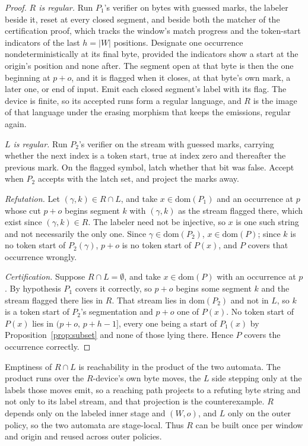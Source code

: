 \documentclass[11pt,a4paper]{article}
\theoremstyle{definition}
\theoremstyle{plain}
\begin{document}
\begin{proof} \emph{$R$ is regular.} Run $P_1$'s verifier on bytes with guessed marks, the labeler beside it, reset at
every closed segment, and beside both the matcher of the certification proof, which tracks the window's match progress
and the token-start indicators of the last $h = |W|$ positions. Designate one occurrence nondeterministically at its
final byte, provided the indicators show a start at the origin's position and none after. The segment open at that byte
is then the one beginning at $p+o$, and it is flagged when it closes, at that byte's own mark, a later one, or end of
input. Emit each closed segment's label with its flag. The device is finite, so its accepted runs form a regular
language, and $R$ is the image of that language under the erasing morphism that keeps the emissions, regular again.

\emph{$L$ is regular.} Run $P_2$'s verifier on the stream with guessed marks, carrying whether the next index is a token
start, true at index zero and thereafter the previous mark. On the flagged symbol, latch whether that bit was false.
Accept when $P_2$ accepts with the latch set, and project the marks away.

\emph{Refutation.} Let $(\gamma, k) \in R \cap L$, and take $x \in \mathrm{dom}(P_1)$ and an occurrence at $p$ whose cut
$p+o$ begins segment $k$ with $(\gamma, k)$ as the stream flagged there, which exist since $(\gamma, k) \in R$. The
labeler need not be injective, so $x$ is one such string and not necessarily the only one. Since
$\gamma \in \mathrm{dom}(P_2)$, $x \in \mathrm{dom}(P)$; since $k$ is no token start of $P_2(\gamma)$, $p+o$ is no token
start of $P(x)$, and $P$ covers that occurrence wrongly.

\emph{Certification.} Suppose $R \cap L = \emptyset$, and take $x \in \mathrm{dom}(P)$ with an occurrence at $p$. By
hypothesis $P_1$ covers it correctly, so $p+o$ begins some segment $k$ and the stream flagged there lies in $R$. That
stream lies in $\mathrm{dom}(P_2)$ and not in $L$, so $k$ is a token start of $P_2$'s segmentation and $p+o$ one of
$P(x)$. No token start of $P(x)$ lies in $(p+o,\,p+h-1]$, every one being a start of $P_1(x)$ by
Proposition~\ref{prop:subset} and none of those lying there. Hence $P$ covers the occurrence correctly.
\end{proof}

Emptiness of $R \cap L$ is reachability in the product of the two automata. The product runs over the $R$-device's own
byte moves, the $L$ side stepping only at the labels those moves emit, so a reaching path projects to a refuting byte
string and not only to its label stream, and that projection is the counterexample. $R$ depends only on the labeled
inner stage and $(W,o)$, and $L$ only on the outer policy, so the two automata are stage-local. Thus $R$ can be built
once per window and origin and reused across outer policies.
\end{document}
